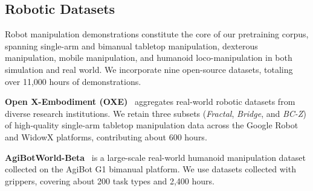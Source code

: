 \begin{table}[h]
\centering
\caption{\textbf{Overview of the training data corpus.}}
\vspace{-4pt}
\label{tab:data_overview}
\tabcolsep 3pt
\end{table}

\subsection{Robotic Datasets}

Robot manipulation demonstrations constitute the core of our pretraining corpus, spanning single-arm and bimanual tabletop manipulation, dexterous manipulation, mobile manipulation, and humanoid loco-manipulation in both simulation and real world.
We incorporate nine open-source datasets, totaling over 11,000 hours of demonstrations.

\textbf{Open X-Embodiment (OXE)}~\citep{padalkar2023openxembodiment} aggregates real-world robotic datasets from diverse research institutions.
We retain three subsets (\emph{Fractal}, \emph{Bridge}, and \emph{BC-Z}) of high-quality single-arm tabletop manipulation data across the Google Robot and WidowX platforms, contributing about 600 hours.

\textbf{AgiBotWorld-Beta}~\citep{bu2025agibotworld} is a large-scale real-world humanoid manipulation dataset collected on the AgiBot G1 bimanual platform. We use datasets collected with grippers, covering about 200 task types and 2,400 hours.

